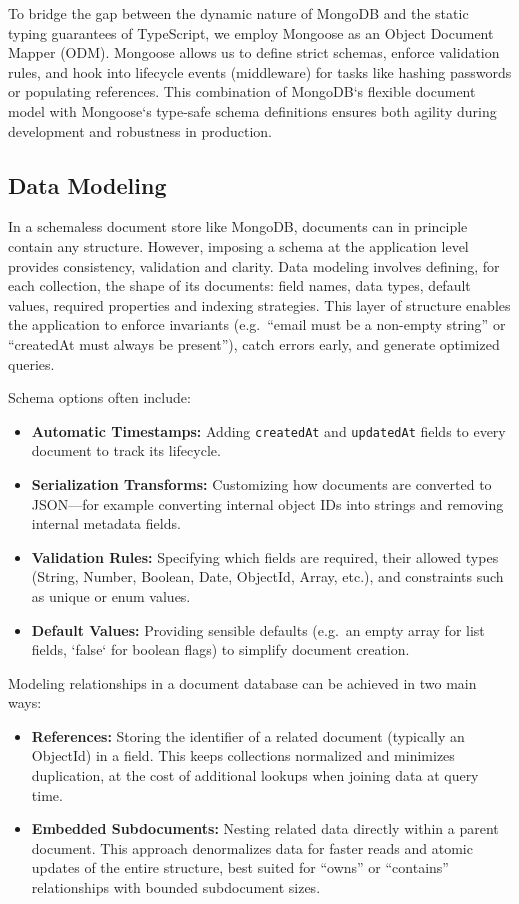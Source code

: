 To bridge the gap between the dynamic nature of MongoDB and the static typing guarantees of TypeScript, we employ Mongoose as an Object Document Mapper (ODM).  Mongoose allows us to define strict schemas, enforce validation rules, and hook into lifecycle events (middleware) for tasks like hashing passwords or populating references.  This combination of MongoDB`s flexible document model with Mongoose`s type-safe schema definitions ensures both agility during development and robustness in production.

\subsection{Data Modeling}

In a schemaless document store like MongoDB, documents can in principle contain any structure.  However, imposing a schema at the application level provides consistency, validation and clarity.  Data modeling involves defining, for each collection, the shape of its documents: field names, data types, default values, required properties and indexing strategies.  This layer of structure enables the application to enforce invariants (e.g.\ “email must be a non-empty string” or “createdAt must always be present”), catch errors early, and generate optimized queries.

Schema options often include:
\begin{itemize}
  \item \textbf{Automatic Timestamps:}  Adding \texttt{createdAt} and \texttt{updatedAt} fields to every document to track its lifecycle.
  \item \textbf{Serialization Transforms:}  Customizing how documents are converted to JSON—for example converting internal object IDs into strings and removing internal metadata fields.
  \item \textbf{Validation Rules:}  Specifying which fields are required, their allowed types (String, Number, Boolean, Date, ObjectId, Array, etc.), and constraints such as unique or enum values.
  \item \textbf{Default Values:}  Providing sensible defaults (e.g.\ an empty array for list fields, `false` for boolean flags) to simplify document creation.
\end{itemize}

Modeling relationships in a document database can be achieved in two main ways:
\begin{itemize}
  \item \textbf{References:}  Storing the identifier of a related document (typically an ObjectId) in a field.  This keeps collections normalized and minimizes duplication, at the cost of additional lookups when joining data at query time.
  \item \textbf{Embedded Subdocuments:}  Nesting related data directly within a parent document.  This approach denormalizes data for faster reads and atomic updates of the entire structure, best suited for “owns” or “contains” relationships with bounded subdocument sizes.
\end{itemize}

